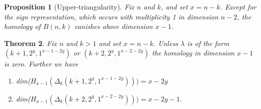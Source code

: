 \documentclass{amsart}
\newtheorem{theorem}{Theorem}
\newtheorem{proposition}[theorem]{Proposition}
\begin{document}

\date{\today}     

\begin{proposition}[Upper-triangularity] \label{P:uppertri} Fix $n$ and $k$, and set $x=n-k$. 
  Except for the sign representation, which occurs with multiplicity 1 in
  dimension $n-2$, the homology of $B(n, k)$ vanishes above dimension $x-1$. 
\end{proposition}

\begin{theorem} Fix $n$ and $k > 1$ and set $x=n-k$. Unless $\lambda$ is of the form $(k+1, 2^y, 1^{x-1-2y})$ or 
$(k+2, 2^y, 1^{x-2-2y})$ the homology in dimension $x-1$ is zero. Further we have
  \begin{enumerate}
    \item dim($H_{x-1}( \Delta_k(k+1, 2^y, 1^{x-1-2y}) )) = x-2y$
    \item dim($H_{x-1}( \Delta_k(k+2, 2^y, 1^{x-2-2y}) )) = x-2y-1.$
  \end{enumerate}
\end{theorem}
\end{document}
